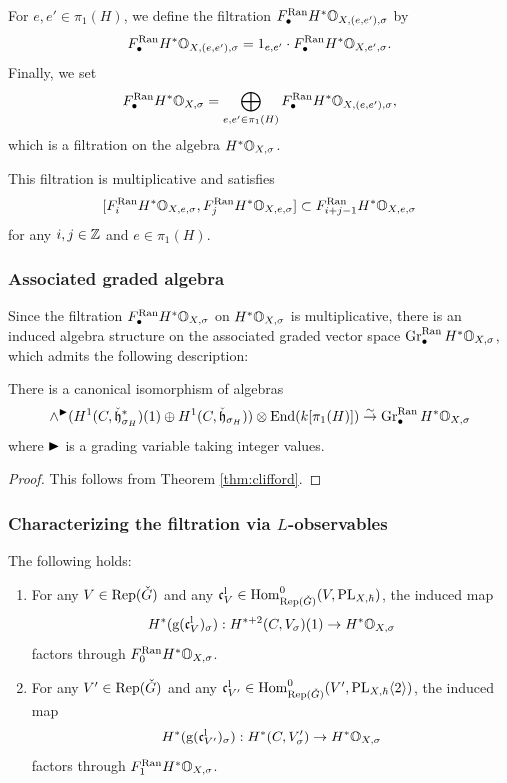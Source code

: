 \documentclass[reqno]{amsart}
\numberwithin{equation}{section}
\numberwithin{equation}{section}
\begin{document}
For $e,e'\in \pi_1(H)$, we define the filtration $F_{\bullet}^{\mathrm{Ran}}H^*\mathbb{O}_{X,(e,e'),\sigma}$ by \[F_{\bullet}^{\mathrm{Ran}}H^*\mathbb{O}_{X,(e,e'),\sigma}=1_{e,e'}\cdot F_{\bullet}^{\mathrm{Ran}}H^*\mathbb{O}_{X,e',\sigma}.\] Finally, we set \[F_{\bullet}^{\mathrm{Ran}}H^*\mathbb{O}_{X,\sigma}=\bigoplus_{e,e'\in \pi_1(H)}F_{\bullet}^{\mathrm{Ran}}H^*\mathbb{O}_{X,(e,e'),\sigma},\] which is a filtration on the algebra $H^*\mathbb{O}_{X,\sigma}$.

This filtration is multiplicative and satisfies \begin{equation}\label{eq:Ranfilcommutator}
    [F_i^{\mathrm{Ran}}H^*\mathbb{O}_{X,e,\sigma}, F_j^{\mathrm{Ran}}H^*\mathbb{O}_{X,e,\sigma}] \subset F_{i+j-1}^{\mathrm{Ran}}H^*\mathbb{O}_{X,e,\sigma}
\end{equation} for any $i,j\in \mathbb{Z}$ and $e\in \pi_1(H)$.

\subsubsection{Associated graded algebra}
Since the filtration $F_{\bullet}^{\mathrm{Ran}}H^*\mathbb{O}_{X,\sigma}$ on $H^*\mathbb{O}_{X,\sigma}$ is multiplicative, there is an induced algebra structure on the associated graded vector space $\operatorname{Gr}^{\mathrm{Ran}}_{\bullet}H^*\mathbb{O}_{X,\sigma}$, which admits the following description: 
\begin{prop}\label{prop:ABLobs}
    There is a canonical isomorphism of algebras \begin{equation} \wedge^{\blacktriangleright}(H^1(C,\check{\mathfrak{h}}_{\sigma_H}^*)(1)\oplus H^1(C,\check{\mathfrak{h}}_{\sigma_H})) \otimes \operatorname{End}(k[\pi_1(H)])\stackrel{\sim}{\to} \operatorname{Gr}_{\bullet}^{\mathrm{Ran}}H^*\mathbb{O}_{X,\sigma} \end{equation} where $\blacktriangleright$ is a grading variable taking integer values.
\end{prop} 
\begin{proof}
    This follows from Theorem \ref{thm:clifford}.
\end{proof}






\subsubsection{Characterizing the filtration via \texorpdfstring{$L$}{L}-observables}

\begin{prop}\label{prop:filtrationvialoc}
    The following holds: \begin{enumerate}
        \item For any $V\in \operatorname{Rep}(\check{G})$ and any $\mathfrak{c}^{\mathrm{l}}_V\in \operatorname{Hom}^0_{\operatorname{Rep}(\check{G})}(V, \mathrm{PL}_{X,\hbar})$, the induced map \[H^*(\mathrm{g}(\mathfrak{c}^{\mathrm{l}}_V)_{\sigma}):H^{*+2}(C,V_{\sigma})(1)\to H^*\mathbb{O}_{X,\sigma}\] factors through $F_0^{\mathrm{Ran}}H^*\mathbb{O}_{X,\sigma}$.

        \item For any $V'\in \operatorname{Rep}(\check{G})$ and any $\mathfrak{c}^{\mathrm{l}}_{V'}\in \operatorname{Hom}^0_{\operatorname{Rep}(\check{G})}(V', \mathrm{PL}_{X,\hbar}\langle 2\rangle)$, the induced map \[H^*(\mathrm{g}(\mathfrak{c}^{\mathrm{l}}_{V'})_{\sigma}):H^*(C,V_{\sigma}')\to H^*\mathbb{O}_{X,\sigma}\] factors through $F_1^{\mathrm{Ran}}H^*\mathbb{O}_{X,\sigma}$.
    \end{enumerate}
\end{prop}
\end{document}
